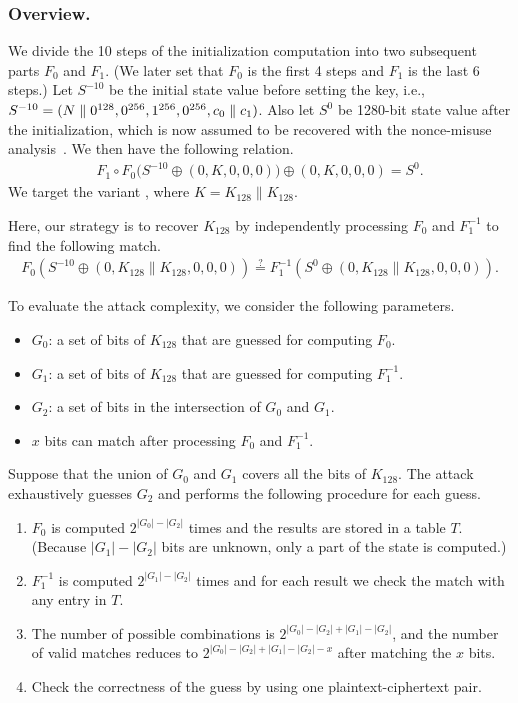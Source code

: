 \subsubsection{Overview.}
We divide the 10 steps of the initialization computation into two subsequent parts $F_0$ and $F_1$. (We later set that $F_0$ is the first 4 steps and $F_1$ is the last 6 steps.) Let $S^{-10}$ be the initial state value before setting the key, i.e., $S^{-10} = (N\mathrel\|0^{128},0^{256},1^{256},0^{256},c_0\mathrel\|c_1)$. Also let $S^0$ be 1280-bit state value after the initialization, which is now assumed to be recovered with the nonce-misuse analysis~\cite{cryptoeprint:2017:1137}. We then have the following relation.
\begin{align*}
F_1 \circ F_0 \bigl(S^{-10} \oplus (0, K, 0, 0, 0)\bigr) \oplus (0,K,0,0,0) = S^0.
\end{align*}
We target the variant \MORUS[1280-128], where $K = K_{128} \mathrel\| K_{128}$.

Here, our strategy is to recover $K_{128}$ by independently processing $F_0$ and $F_1^{-1}$ to find the following match.
\begin{align*}
  F_0 (S^{-10} \oplus (0, K_{128}\|K_{128}, 0, 0, 0)) \stackrel{?}{=} F_1^{-1} (S^0 \oplus (0,K_{128}\|K_{128},0,0,0)).
\end{align*}

To evaluate the attack complexity, we consider the following parameters.
\begin{itemize}
\item $G_0$: a set of bits of $K_{128}$ that are guessed for computing $F_0$.
\item $G_1$: a set of bits of $K_{128}$ that are guessed for computing $F_1^{-1}$.
\item $G_2$: a set of bits in the intersection of $G_0$ and $G_1$.
\item $x$ bits can match after processing $F_0$ and $F_1^{-1}$.
\end{itemize}
Suppose that the union of $G_0$ and $G_1$ covers all the bits of $K_{128}$. The attack exhaustively guesses $G_2$ and performs the following procedure for each guess.
\begin{enumerate}
\item $F_0$ is computed $2^{|G_0|-|G_2|}$ times and the results are stored in a table $T$. (Because $|G_1|-|G_2|$ bits are unknown, only a part of the state is computed.)
\item $F_1^{-1}$ is computed $2^{|G_1|-|G_2|}$ times and for each result we check the match with any entry in $T$.
\item The number of possible combinations is $2^{|G_0|-|G_2| + |G_1|-|G_2|}$, and the number of valid matches reduces to $2^{|G_0|-|G_2| + |G_1|-|G_2| - x}$ after matching the $x$ bits.
\item Check the correctness of the guess by using one plaintext-ciphertext pair.
\end{enumerate}

